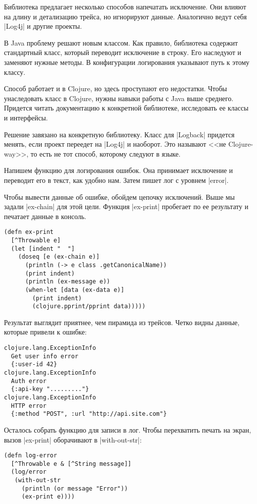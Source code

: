 Библиотека предлагает несколько способов напечатать исключение. Они влияют на
длину и детализацию трейса, но игнорируют данные. Аналогично ведут себя
\spverb|Log4j| и другие проекты.

В Java проблему решают новым классом. Как правило, библиотека содержит
стандартный класс, который переводит исключение в строку. Его наследуют и
заменяют нужные методы. В конфигурации логирования указывают путь к этому
классу.

Способ работает и в Clojure, но здесь проступают его недостатки. Чтобы
унаследовать класс в Clojure, нужны навыки работы с Java выше среднего. Придется
читать документацию к конкретной библиотеке, исследовать ее классы и интерфейсы.

Решение завязано на конкретную библиотеку. Класс для \spverb|Logback| придется
менять, если проект переедет на \spverb|Log4j| и наоборот. Это называют <<не
Clojure-way>>, то есть не тот способ, которому следуют в языке.

Напишем функцию для логирования ошибок. Она принимает исключение и переводит его
в текст, как удобно нам. Затем пишет лог с уровнем \spverb|error|.

Чтобы вывести данные об ошибке, обойдем цепочку исключений. Выше мы задали
\spverb|ex-chain| для этой цели. Функция \spverb|ex-print| пробегает по ее
результату и печатает данные в консоль.

\begin{verbatim}
(defn ex-print
  [^Throwable e]
  (let [indent "  "]
    (doseq [e (ex-chain e)]
      (println (-> e class .getCanonicalName))
      (print indent)
      (println (ex-message e))
      (when-let [data (ex-data e)]
        (print indent)
        (clojure.pprint/pprint data)))))
\end{verbatim}

Результат выглядит приятнее, чем пирамида из трейсов. Четко видны данные,
которые привели к ошибке:

\begin{verbatim}
clojure.lang.ExceptionInfo
  Get user info error
  {:user-id 42}
clojure.lang.ExceptionInfo
  Auth error
  {:api-key "........."}
clojure.lang.ExceptionInfo
  HTTP error
  {:method "POST", :url "http://api.site.com"}
\end{verbatim}

Осталось собрать функцию для записи в лог. Чтобы перехватить печать на экран,
вызов \spverb|ex-print| оборачивают в \spverb|with-out-str|:

\begin{verbatim}
(defn log-error
  [^Throwable e & [^String message]]
  (log/error
   (with-out-str
     (println (or message "Error"))
     (ex-print e))))
\end{verbatim}


